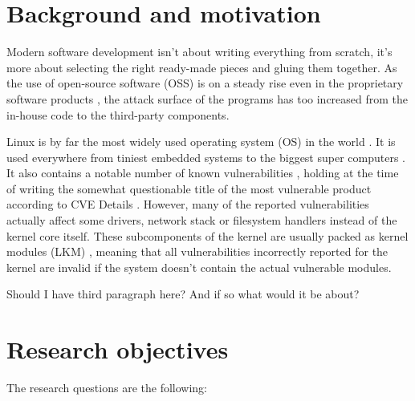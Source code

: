 
\section{Background and motivation}

Modern software development isn't about writing everything from scratch, it's more about selecting
the right ready-made pieces and gluing them together. As the use of open-source software (OSS) is
on a steady rise even in the proprietary software products \cite{deshpande2008total}, the attack
surface of the programs has too increased from the in-house code to the third-party components.

Linux is by far the most widely used operating system (OS) in the world \cite{blah}. It is used
everywhere from tiniest embedded systems \cite{picotux} to the biggest super computers
\cite{top500linuxshare}. It also contains a notable number of known vulnerabilities
\cite{cvedetailslinuxkernel}, holding at the time of writing the somewhat questionable title of the
most vulnerable product according to CVE Details \cite{cvedetailstop50}. However, many of the
reported vulnerabilities actually affect some drivers, network stack or filesystem handlers instead
of the kernel core itself. These subcomponents of the kernel are usually packed as kernel modules
(LKM) \cite{blah}, meaning that all vulnerabilities incorrectly reported for the kernel are invalid
if the system doesn't contain the actual vulnerable modules.

Should I have third paragraph here? And if so what would it be about?

\section{Research objectives}
\label{sect:questions}

The research questions are the following:



